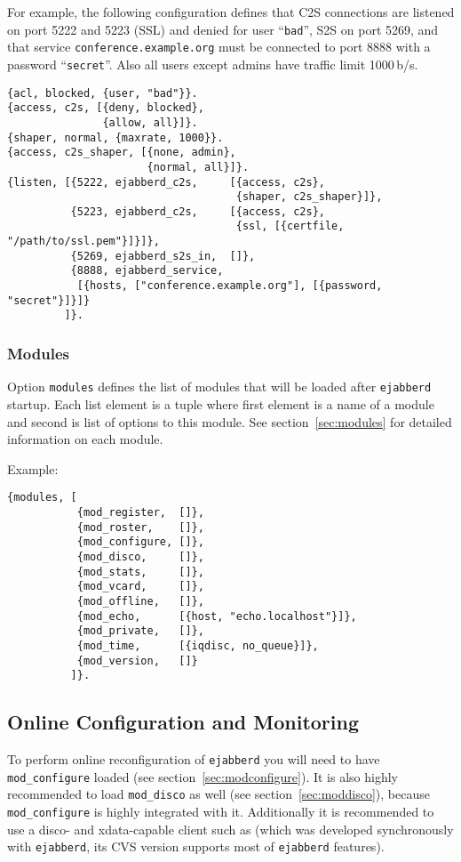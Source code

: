 \documentclass[10pt]{article}
\newcommand{\ejabberd}{\texttt{ejabberd}}
\newcommand{\modconfigure}{\texttt{mod\_configure}}
\newcommand{\moddisco}{\texttt{mod\_disco}}
\begin{document}
For example, the following configuration defines that C2S connections are
listened on port 5222 and 5223 (SSL) and denied for user ``\texttt{bad}'', S2S
on port 5269, and that service \texttt{conference.example.org} must be
connected to port 8888 with a password ``\texttt{secret}''.  Also all users
except admins have traffic limit 1000\,b/s.
\begin{verbatim}
{acl, blocked, {user, "bad"}}.
{access, c2s, [{deny, blocked},
               {allow, all}]}.
{shaper, normal, {maxrate, 1000}}.
{access, c2s_shaper, [{none, admin},
                      {normal, all}]}.
{listen, [{5222, ejabberd_c2s,     [{access, c2s},
                                    {shaper, c2s_shaper}]},
          {5223, ejabberd_c2s,     [{access, c2s},
                                    {ssl, [{certfile, "/path/to/ssl.pem"}]}]},
          {5269, ejabberd_s2s_in,  []},
          {8888, ejabberd_service,
           [{hosts, ["conference.example.org"], [{password, "secret"}]}]}
         ]}.
\end{verbatim}




\subsubsection{Modules}
\label{sec:configmodules}

Option \texttt{modules} defines the list of modules that will be loaded after
\ejabberd{} startup.  Each list element is a tuple where first element is a
name of a module and second is list of options to this module.  See
section~\ref{sec:modules} for detailed information on each module.

Example:
\begin{verbatim}
{modules, [
           {mod_register,  []},
           {mod_roster,    []},
           {mod_configure, []},
           {mod_disco,     []},
           {mod_stats,     []},
           {mod_vcard,     []},
           {mod_offline,   []},
           {mod_echo,      [{host, "echo.localhost"}]},
           {mod_private,   []},
           {mod_time,      [{iqdisc, no_queue}]},
           {mod_version,   []}
          ]}.
\end{verbatim}


\subsection{Online Configuration and Monitoring}
\label{sec:onlineconfig}

To perform online reconfiguration of \ejabberd{} you will need to have
\modconfigure{} loaded (see section~\ref{sec:modconfigure}). It is also highly
recommended to load \moddisco{} as well (see section~\ref{sec:moddisco}),
because \modconfigure{} is highly integrated with it.  Additionally it is
recommended to use a disco- and xdata-capable client such as
(which was developed synchronously with \ejabberd{}, its CVS version
supports most of \ejabberd{} features).
\end{document}
